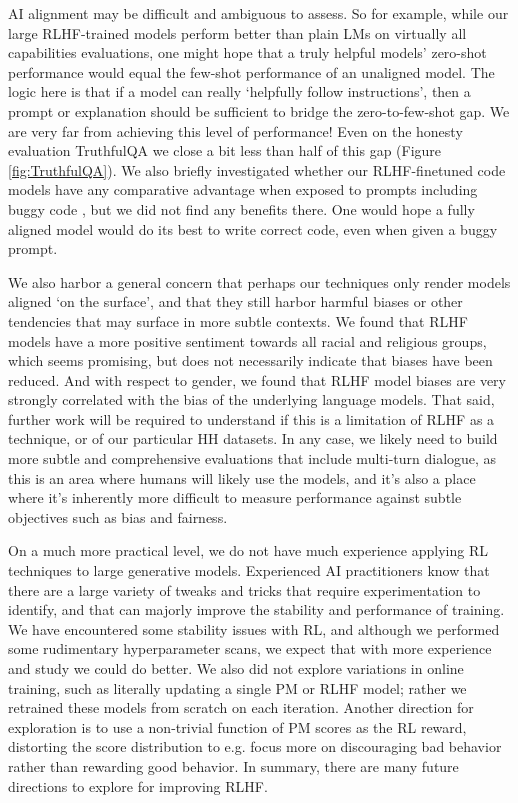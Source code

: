 AI alignment may be difficult and ambiguous to assess.  So for example, while our large RLHF-trained models perform better than plain LMs on virtually all capabilities evaluations, one might hope that a truly helpful models' zero-shot performance would equal the few-shot performance of an unaligned model.  The logic here is that if a  model can really `helpfully follow instructions', then a prompt or explanation should be sufficient to bridge the zero-to-few-shot gap.  We are very far from achieving this level of performance! Even on the honesty evaluation TruthfulQA \cite{lin2021truthfulqa} we close a bit less than half of this gap (Figure \ref{fig:TruthfulQA}).  We also briefly investigated whether our RLHF-finetuned code models have any comparative advantage when exposed to prompts including buggy code \cite{chen2021codex}, but we did not find any benefits there.  One would hope a fully aligned model would do its best to write correct code, even when given a buggy prompt.

We also harbor a general concern that perhaps our techniques only render models aligned `on the surface', and that they still harbor harmful biases or other tendencies that may surface in more subtle contexts.  We found that RLHF models have a more positive sentiment towards all racial and religious groups, which seems promising, but does not necessarily indicate that biases have been reduced.  And with respect to gender, we found that RLHF model biases are very strongly correlated with the bias of the underlying language models.  That said, further work will be required to understand if this is a limitation of RLHF as a technique, or of our particular HH datasets.  In any case, we likely need to build more subtle and comprehensive evaluations that include multi-turn dialogue, as this is an area where humans will likely use the models, and it's also a place where it's inherently more difficult to measure performance against subtle objectives such as bias and fairness.

On a much more practical level, we do not have much experience applying RL techniques to large generative models.  Experienced AI practitioners  know that there are a large variety of tweaks and tricks that require experimentation to identify, and that can majorly improve the stability and performance of training.  We have encountered some stability issues with RL, and although we performed some rudimentary hyperparameter scans, we expect that with more experience and study we could do better. We also did not explore variations in online training, such as literally updating a single PM or RLHF model; rather we retrained these models from scratch on each iteration.  Another direction for exploration is to use a non-trivial function of PM scores as the RL reward, distorting the score distribution to e.g. focus more on discouraging bad behavior rather than rewarding good behavior.  In summary, there are many future directions to explore for improving RLHF.


